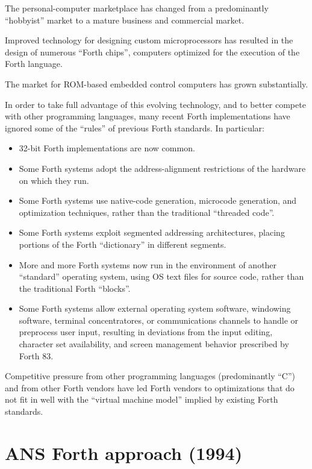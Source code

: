 The personal-computer marketplace has changed from a predominantly
``hobbyist'' market to a mature business and commercial market.

Improved technology for designing custom microprocessors has resulted
in the design of numerous ``Forth chips'', computers optimized for
the execution of the Forth language.

The market for ROM-based embedded control computers has grown
substantially.

In order to take full advantage of this evolving technology, and to
better compete with other programming languages, many recent Forth
implementations have ignored some of the ``rules'' of previous Forth
standards. In particular:

\begin{itemize}
\item 32-bit Forth implementations are now common.
\item Some Forth systems adopt the address-alignment restrictions of
	the hardware on which they run.
\item Some Forth systems use native-code generation, microcode
	generation, and optimization techniques, rather than the
	traditional ``threaded code''.
\item Some Forth systems exploit segmented addressing architectures,
	placing portions of the Forth ``dictionary'' in different segments.
\item More and more Forth systems now run in the environment of another
	``standard'' operating system, using OS text files for source code,
	rather than the traditional Forth ``blocks''.
\item Some Forth systems allow external operating system software,
	windowing software, terminal con\-cen\-tratores, or communications
	channels to handle or preprocess user input, resulting in deviations
	from the input editing, character set availability, and screen
	management behavior prescribed by Forth 83.
\end{itemize}

Competitive pressure from other programming languages (predominantly
``C'') and from other Forth ven\-dors have led Forth vendors to
optimizations that do not fit in well with the ``virtual machine
model'' implied by existing Forth standards.


\cbstart{}
\section[ANS Forth (1994)]{ANS Forth approach (1994)} %
\label{diff:ans}
\cbend


